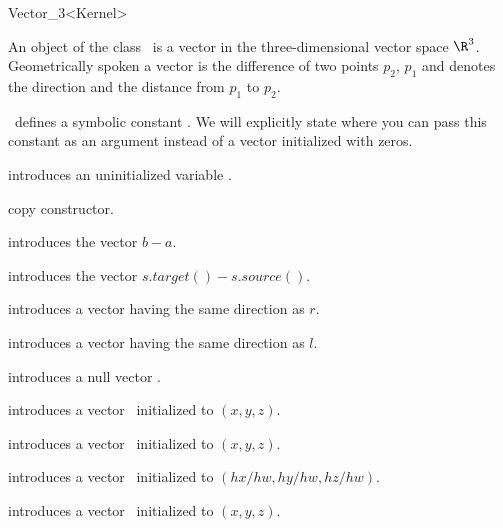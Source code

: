 \begin{ccRefClass} {Vector_3<Kernel>}

\ccDefinition

An object of the class \ccRefName\ is a vector in the three-dimensional 
vector space $\R^3$. Geometrically spoken a vector is the difference
of two points $p_2$, $p_1$ and denotes the direction and the distance
from   $p_1$ to $p_2$. 

\cgal\ defines a symbolic constant . We 
will explicitly state where you can pass this constant as an argument
instead of a vector initialized with zeros.


\ccCreation
{}


\ccHidden{}
             {introduces an uninitialized variable \ccVar.}

\ccHidden {}
            {copy constructor.}

            {introduces the vector $b-a$.}

            {introduces the vector $s.target()-s.source()$.}

            {introduces a vector having the same direction as $r$.}

            {introduces a vector having the same direction as $l$.}

            {introduces a null vector \ccVar.}

            {introduces a vector \ccVar\ initialized to $(x, y, z)$.}

            {introduces a vector \ccVar\ initialized to $(x, y, z)$.}

            {introduces a vector \ccVar\ initialized to $(hx/hw, hy/hw, hz/hw)$.}

            {introduces a vector \ccVar\ initialized to $(x, y, z)$.}


\ccOperations


\end{ccRefClass}
